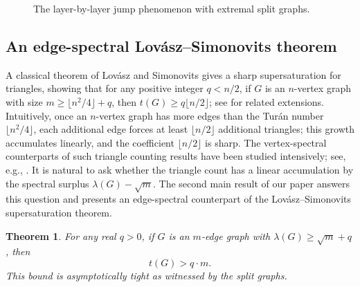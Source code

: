 \documentclass[11pt,a4paper]{article}
\newtheorem{theorem}{Theorem}[section]
\theoremstyle{definition}
\theoremstyle{plain}
\renewcommand{\ge}{\geqslant}
\begin{document}
\begin{figure}[htbp]
\vspace{-2mm}
\caption{The layer-by-layer jump phenomenon with extremal split graphs.}
\label{fig:jump-layers}
\end{figure}
 
 
\vspace{-3mm}
\subsection{An edge-spectral Lov\'{a}sz--Simonovits theorem}


A classical theorem of Lov\'asz and Simonovits \cite{LovaszSimonovits1975,LS1983}
gives a sharp supersaturation for triangles, showing that for any positive integer $q< n/2$, if $G$ is an $n$-vertex graph with size $m\ge \lfloor n^2/4 \rfloor +q$, then $t(G)\ge q\lfloor n/2 \rfloor$; see \cite{Mubayi2010, PY2017, MY2023} for related extensions.   
Intuitively, once an $n$-vertex graph has more edges than the Tur\'{a}n number $\lfloor n^2/4\rfloor$, each additional edge forces at least $\lfloor n/2\rfloor$ additional triangles; this growth accumulates linearly, and the coefficient $\lfloor n/2\rfloor$ is sharp. 
The vertex-spectral counterparts of such triangle counting
results have been studied intensively; see, e.g., \cite{LiFengPeng2026, FLLM2025}. 
It is natural to ask whether the triangle count has a linear accumulation by the spectral surplus $\lambda(G)-\sqrt{m}$. 
The second main result of our paper answers this question and presents an edge-spectral counterpart of the Lov\'{a}sz--Simonovits supersaturation theorem. 




\begin{theorem}  \label{thm-edge-spect-LS}
For any real $q> 0$, if $G$ is an $m$-edge graph with $\lambda (G) \ge \sqrt{m}+ q$, then 
$$t(G)> q\cdot m. $$ 
This bound is asymptotically tight as witnessed by the split graphs.
\end{theorem} 
\end{document}
